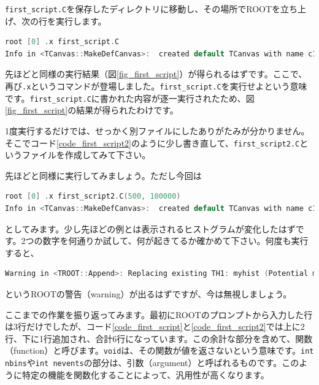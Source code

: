 \texttt{first\_script.C}を保存したディレクトリに移動し、その場所でROOTを立ち上げ、次の行を実行します。
\begin{lstlisting}[language=c++]
root [0] .x first_script.C
Info in <TCanvas::MakeDefCanvas>:  created default TCanvas with name c1
\end{lstlisting}
先ほどと同様の実行結果（図\ref{fig_first_script}）が得られるはずです。ここで、再び\texttt{.x}というコマンドが登場しました。\texttt{first\_script.C}を実行せよという意味です。\texttt{first\_script.C}に書かれた内容が逐一実行されたため、図\ref{fig_first_script}の結果が得られたわけです。

1度実行するだけでは、せっかく別ファイルにしたありがたみが分かりません。そこでコード\ref{code_first_script2}のように少し書き直して、\texttt{first\_script2.C}というファイルを作成してみて下さい。

先ほどと同様に実行してみましょう。ただし今回は
\begin{lstlisting}[language=c++]
root [0] .x first_script2.C(500, 100000)
Info in <TCanvas::MakeDefCanvas>:  created default TCanvas with name c1
\end{lstlisting}
としてみます。少し先ほどの例とは表示されるヒストグラムが変化したはずです。2つの数字を何通りか試して、何が起きてるか確かめて下さい。何度も実行すると、
\begin{lstlisting}[language=c++]
Warning in <TROOT::Append>: Replacing existing TH1: myhist (Potential memory leak).
\end{lstlisting}
というROOTの警告（warning）が出るはずですが、今は無視しましょう。

ここまでの作業を振り返ってみます。最初にROOTのプロンプトから入力した行は3行だけでしたが、コード\ref{code_first_script}と\ref{code_first_script2}では上に2行、下に1行追加され、合計6行になっています。この余計な部分を含めて、関数（function）と呼びます。\texttt{void}は、その関数が値を返さないという意味です。\texttt{int nbins}や\texttt{int nevents}の部分は、引数（argument）と呼ばれるものです。このように特定の機能を関数化することによって、汎用性が高くなります。

